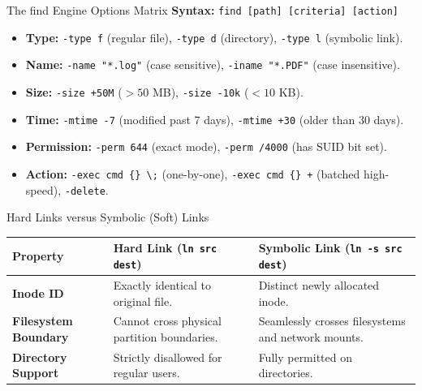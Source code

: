 \begin{cheatbox}{The find Engine Options Matrix}
\textbf{Syntax:} \texttt{find [path] [criteria] [action]}
\begin{itemize}[leftmargin=1.5em]
    \item \textbf{Type:} \texttt{-type f} (regular file), \texttt{-type d} (directory), \texttt{-type l} (symbolic link).
    \item \textbf{Name:} \texttt{-name "*.log"} (case sensitive), \texttt{-iname "*.PDF"} (case insensitive).
    \item \textbf{Size:} \texttt{-size +50M} ($>50$ MB), \texttt{-size -10k} ($<10$ KB).
    \item \textbf{Time:} \texttt{-mtime -7} (modified past 7 days), \texttt{-mtime +30} (older than 30 days).
    \item \textbf{Permission:} \texttt{-perm 644} (exact mode), \texttt{-perm /4000} (has SUID bit set).
    \item \textbf{Action:} \texttt{-exec cmd \{\} \textbackslash;} (one-by-one), \texttt{-exec cmd \{\} +} (batched high-speed), \texttt{-delete}.
\end{itemize}
\end{cheatbox}

\begin{syntaxbox}{Hard Links versus Symbolic (Soft) Links}
\begin{tabularx}{\linewidth}{l X X}
\toprule
\textbf{Property} & \textbf{Hard Link (\texttt{ln src dest})} & \textbf{Symbolic Link (\texttt{ln -s src dest})} \\
\midrule
\textbf{Inode ID} & Exactly identical to original file. & Distinct newly allocated inode. \\
\textbf{Filesystem Boundary} & Cannot cross physical partition boundaries. & Seamlessly crosses filesystems and network mounts. \\
\textbf{Directory Support} & Strictly disallowed for regular users. & Fully permitted on directories. \\
\bottomrule
\end{tabularx}
\end{syntaxbox}
